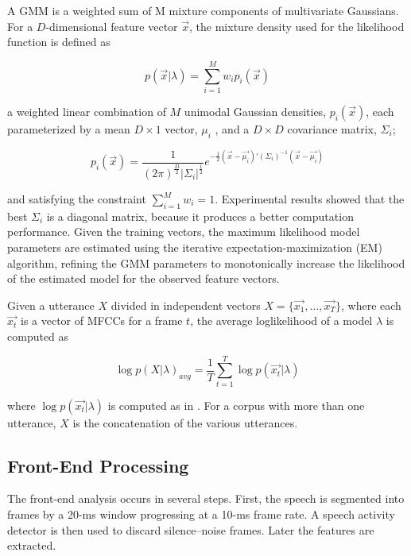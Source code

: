 \documentclass[a4paper,twocolumn]{article}
\begin{document}
A GMM is a weighted sum of M mixture components of multivariate Gaussians. For a $D$-dimensional feature vector $\vec{x}$, the mixture density used for the likelihood function is defined as

\begin{equation}
    \label{eq:gmm_likelihood}
    p(\vec{x}|\lambda) = \sum_{i=1}^M w_i p_i(\vec{x})
\end{equation}

\noindent a weighted linear combination of $M$ unimodal Gaussian densities, $p_i(\vec{x})$, each parameterized by a mean $D\times 1$ vector, $\mu_i$ , and a $D\times D$ covariance matrix, $\Sigma_i$;

\begin{equation}
    \label{eq:gmm}
    p_i(\vec{x}) = \frac{1}{(2\pi)^\frac{D}{2}|\Sigma_i|^\frac{1}{2}}e^{-\frac{1}{2}(\vec{x} - \vec{\mu_i})'(\Sigma_i)^{-1}(\vec{x} - \vec{\mu_i})}
\end{equation}

\noindent and satisfying the constraint $\sum_{i=1}^M w_i = 1$. Experimental results showed that the best $\Sigma_i$ is a diagonal matrix, because it produces a better computation performance. Given the training vectors, the maximum likelihood model parameters are estimated using the iterative expectation-maximization (EM) algorithm, refining the GMM parameters to monotonically increase the likelihood of the estimated model for the observed feature vectors.

Given a utterance $X$ divided in independent vectors $X = \{\vec{x_1}, \dots, \vec{x_T}\}$, where each $\vec{x_t}$ is a vector of MFCCs for a frame $t$, the average loglikelihood of a model $\lambda$ is computed as

\begin{equation}
    \label{eq:loglikelihood_lambda}
    \log p(X|\lambda)_{avg} = \frac{1}{T}\sum_{t=1}^T \log p(\vec{x_t}|\lambda)
\end{equation}

\noindent where $\log p(\vec{x_t}|\lambda)$ is computed as in . For a corpus with more than one utterance, $X$ is the concatenation of the various utterances.

\subsection{Front-End Processing}

The front-end analysis occurs in several steps. First, the speech is segmented into frames by a 20-ms window progressing at a 10-ms frame rate. A speech activity detector is then used to discard silence–noise frames. Later the features are extracted.
\end{document}
